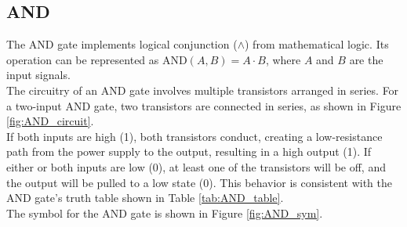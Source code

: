 \subsection{AND}
	The AND gate implements logical conjunction ($\land$) from mathematical logic.
	Its operation can be represented as $\text{AND}(A, B) = A \cdot B$, where $A$ and $B$ are the input signals. \\
	The circuitry of an AND gate involves multiple transistors arranged in series. 
	For a two-input AND gate, two transistors are connected in series, as shown in Figure \ref{fig:AND_circuit}. \\
	If both inputs are high (1), both transistors conduct, creating a low-resistance path from the power supply to the output, resulting in a high output (1). 
	If either or both inputs are low (0), at least one of the transistors will be off, and the output will be pulled to a low state (0). 
    This behavior is consistent with the AND gate's truth table shown in Table \ref{tab:AND_table}. \\
	The symbol for the AND gate is shown in Figure \ref{fig:AND_sym}.

